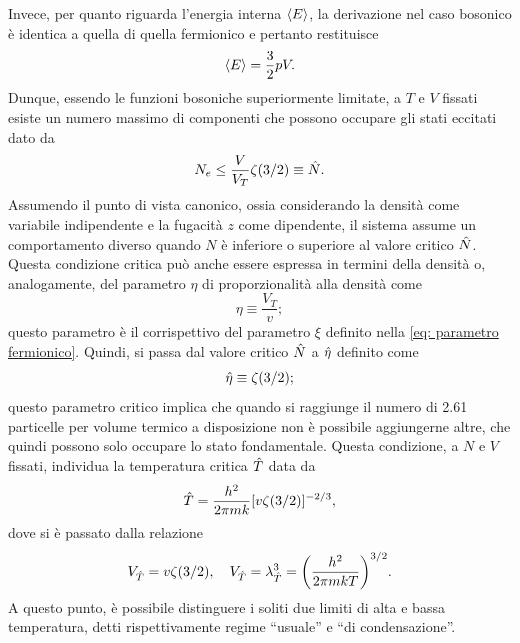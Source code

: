 Invece, per quanto riguarda l'energia interna $\langle E \rangle$, la derivazione nel caso bosonico è identica a quella di quella fermionico e pertanto restituisce 
\begin{equation}
    \langle E \rangle = \frac{3}{2}pV.
\end{equation}
Dunque, essendo le funzioni bosoniche superiormente limitate, a $T$ e $V$ fissati esiste un numero massimo di componenti che possono occupare gli stati eccitati dato da
\begin{equation}
    N_e \le \frac{V}{V_T}\zeta(3/2) \equiv \hat{N}.
\end{equation}
Assumendo il punto di vista canonico, ossia considerando la densità come variabile indipendente e la fugacità $z$ come dipendente, il sistema assume un comportamento diverso quando $N$ è inferiore o superiore al valore critico $\hat{N}$. Questa condizione critica può anche essere espressa in termini della densità o, analogamente, del parametro $\eta$ di proporzionalità alla densità come
\begin{equation}
\label{eq: parametro bosonico}
    \eta \equiv \frac{V_T}{v};
\end{equation}
questo parametro è il corrispettivo del parametro $\xi$ definito nella \eqref{eq: parametro fermionico}. Quindi, si passa dal valore critico $\hat{N}$ a $\hat{\eta}$ definito come
\begin{equation}
    \hat{\eta} \equiv \zeta(3/2);
\end{equation}
questo parametro critico implica che quando si raggiunge il numero di 2.61 particelle per volume termico a disposizione non è possibile aggiungerne altre, che quindi possono solo occupare lo stato fondamentale. Questa condizione, a $N$ e $V$ fissati, individua la temperatura critica $\hat{T}$ data da
\begin{equation}
\label{eq: temperatura critica gas di bosoni (grancanonico)}
    \hat{T} = \frac{h^2}{2\pi mk}[v\zeta(3/2)]^{-2/3},
\end{equation}
dove si è passato dalla relazione
\begin{equation}
    V_{\hat{T}} = v\zeta(3/2),\quad V_{\hat{T}} = \lambda_{\hat{T}}^{3} = \bigg(\frac{h^2}{2\pi mkT}\bigg)^{3/2}.
\end{equation}
A questo punto, è possibile distinguere i soliti due limiti di alta e bassa temperatura, detti rispettivamente regime ``usuale'' e ``di condensazione''. 

